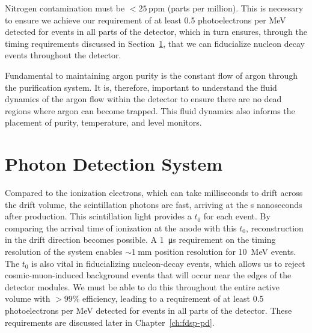 Nitrogen contamination must be $<\!25$\,ppm (parts per million). This is necessary to ensure we achieve our requirement of at least 0.5 photoelectrons per MeV detected for events in all parts of the detector, which in turn ensures, through the timing requirements discussed in Section~\ref{sec:fdsp-exec-pds}, that we can fiducialize nucleon decay events throughout the detector.



Fundamental to maintaining argon purity is the constant flow of argon through the purification system. It is, therefore, important to understand the fluid dynamics of the argon flow within the detector to ensure there are no dead regions where argon can become trapped. This fluid dynamics also informs the placement of purity, temperature, and level monitors.



\section{Photon Detection System}
\label{sec:fdsp-exec-pds}

Compared to the ionization electrons, which can take milliseconds to drift across the drift volume, the scintillation photons are fast, arriving at the s nanoseconds after production. This scintillation light provides a $t_{0}$ for each event. By comparing the arrival time of ionization at the anode with this $t_{0}$, reconstruction in the drift direction becomes possible. A \SI{1}{\micro\second} requirement on the timing resolution of the  system enables $\sim\!\SI{1}{\mm}$ position resolution for \SI{10}{\mega\electronvolt}  events. The  $t_{0}$ is also vital in fiducializing nucleon-decay events, which allows us to reject cosmic-muon-induced background events that will occur near the edges of the detector modules. We must be able to do this throughout the entire active volume with $>\!99\%$ efficiency, leading to a requirement of at least 0.5 photoelectrons per MeV detected for events in all parts of the detector. These requirements are discussed later in Chapter~\ref{ch:fdsp-pd}.

